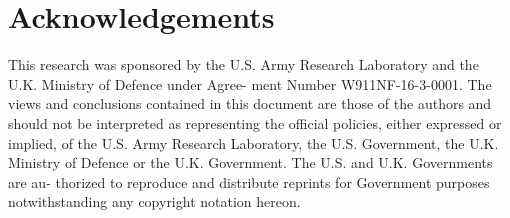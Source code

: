 \section*{Acknowledgements}
This research was sponsored by the U.S. Army Research Laboratory and the U.K. Ministry of Defence under Agree- ment Number W911NF-16-3-0001. The views and conclusions contained in this document are those of the authors and should not be interpreted as representing the official policies, either expressed or implied, of the U.S. Army Research Laboratory, the U.S. Government, the U.K. Ministry of Defence or the U.K. Government. The U.S. and U.K. Governments are au- thorized to reproduce and distribute reprints for Government purposes notwithstanding any copyright notation hereon.
